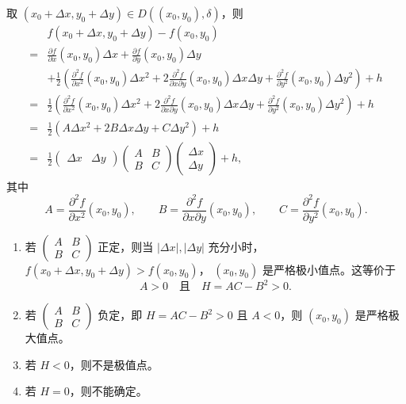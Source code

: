 取 $(x_0+\Delta x,y_0+\Delta y)\in D((x_0,y_0),\delta)$，则
\[
\begin{aligned}
&f(x_0+\Delta x,y_0+\Delta y)-f(x_0,y_0)\\
={}&\frac{\partial f}{\partial x}(x_0,y_0)\Delta x
+\frac{\partial f}{\partial y}(x_0,y_0)\Delta y\\
&+\frac12\left(
\frac{\partial^2 f}{\partial x^2}(x_0,y_0)\Delta x^2
+2\frac{\partial^2 f}{\partial x\partial y}(x_0,y_0)
\Delta x\Delta y
+\frac{\partial^2 f}{\partial y^2}(x_0,y_0)\Delta y^2
\right)+h\\
={}&\frac12\left(
\frac{\partial^2 f}{\partial x^2}(x_0,y_0)\Delta x^2
+2\frac{\partial^2 f}{\partial x\partial y}(x_0,y_0)
\Delta x\Delta y
+\frac{\partial^2 f}{\partial y^2}(x_0,y_0)\Delta y^2
\right)+h\\
={}&\frac12\left(A\Delta x^2+2B\Delta x\Delta y+C\Delta y^2\right)+h\\
={}&\frac12
\begin{pmatrix}\Delta x&\Delta y\end{pmatrix}
\begin{pmatrix}A&B\\B&C\end{pmatrix}
\begin{pmatrix}\Delta x\\\Delta y\end{pmatrix}+h,
\end{aligned}
\]
其中
\[
A=\frac{\partial^2 f}{\partial x^2}(x_0,y_0),
\qquad
B=\frac{\partial^2 f}{\partial x\partial y}(x_0,y_0),
\qquad
C=\frac{\partial^2 f}{\partial y^2}(x_0,y_0).
\]

\begin{enumerate}
\item 若 $\begin{pmatrix}A&B\\B&C\end{pmatrix}$ 正定，则当
$|\Delta x|,|\Delta y|$ 充分小时，
$f(x_0+\Delta x,y_0+\Delta y)>f(x_0,y_0)$，
$(x_0,y_0)$ 是严格极小值点。这等价于
\[
A>0\quad\text{且}\quad H=AC-B^2>0.
\]
\item 若 $\begin{pmatrix}A&B\\B&C\end{pmatrix}$ 负定，即
$H=AC-B^2>0$ 且 $A<0$，则 $(x_0,y_0)$ 是严格极大值点。
\item 若 $H<0$，则不是极值点。
\item 若 $H=0$，则不能确定。
\end{enumerate}

